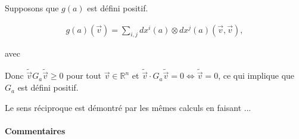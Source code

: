 \documentclass[french]{article}
\theoremstyle{definition}
\theoremstyle{remark}
\begin{document}
Supposons que \(g(a)\) est défini positif.

\begin{gather*}
  g(a)(\overrightarrow{v}) = \sum_{i,j}^{} d x ^{i}(a) \otimes d x ^{j}(a)(\overrightarrow{v}, \overrightarrow{v}),
\end{gather*}

avec


Donc \(\tilde{\overrightarrow{v}} G_a \tilde{\overrightarrow{v}} \geq 0\) pour tout \(\overrightarrow{v} \in \mathbb{R}^n\) et \(\tilde{\overrightarrow{v}} \cdot G_a \tilde{\overrightarrow{v}} = 0 \iff \tilde{\overrightarrow{v}} = 0\), ce qui implique que \(G_a\) est défini positif.

Le sens réciproque est démontré par les mêmes calculs en faisant ...

\paragraph{Commentaires}
\end{document}
